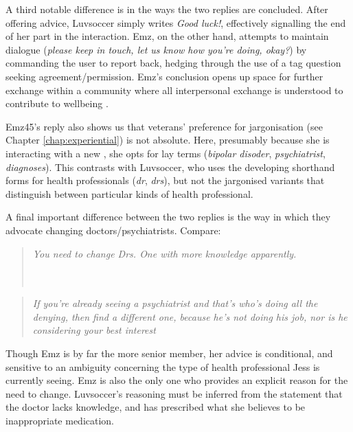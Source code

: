 A third notable difference is in the ways the two replies are concluded. After offering advice, Luvsoccer simply writes \emph{Good luck!}, effectively signalling the end of her part in the interaction. Emz, on the other hand, attempts to maintain dialogue (\emph{please keep in touch, let us know how you're 
doing, okay?}) by commanding the user to report back, hedging through the use of a tag question seeking agreement\slash permission. Emz's conclusion opens up space for further exchange within a community where all interpersonal exchange is understood to contribute to wellbeing \parencite[c.f.][]{althoff_counseling_2016}.

Emz45's reply also shows us that veterans' preference for jargonisation (see Chapter \ref{chap:experiential}) is not absolute. Here, presumably because she is interacting with a new , she opts for lay terms (\emph{bipolar disoder}, \emph{psychiatrist}, \emph{diagnoses}). This contrasts with Luvsoccer, who uses the developing shorthand forms for health professionals (\emph{dr}, \emph{drs}), but not the jargonised variants that distinguish between particular kinds of health professional.

A final important difference between the two replies is the way in which they advocate changing doctors\slash psychiatrists. Compare:

\begin{multicols}{2}
\begin{quote}

\emph{You need to change Drs. One with more knowledge apparently.} ~\\~\\~\\
\end{quote}

\begin{quote}

\emph{If you're already seeing a psychiatrist and that's who's doing all the denying, then find a different one, because he's not doing his job, nor is he considering your best interest}
\end{quote}
\end{multicols}
%
\noindent Though Emz is by far the more senior member, her advice is conditional, and sensitive to an ambiguity concerning the type of health professional Jess is currently seeing. Emz is also the only one who provides an explicit reason for the need to change. Luvsoccer's reasoning must be inferred from the statement that the doctor lacks knowledge, and has prescribed what she believes to be inappropriate medication. 

